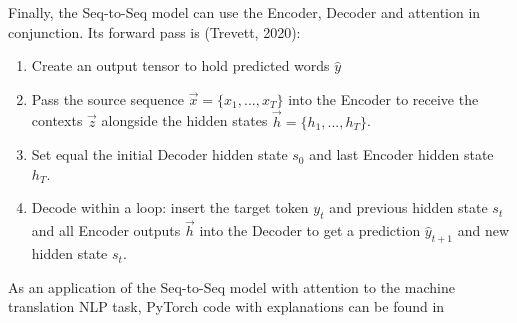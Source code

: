 Finally, the Seq-to-Seq model can use the Encoder, Decoder and attention in conjunction. Its forward pass is (Trevett, 2020): 
\begin{enumerate}
    \item Create an output tensor to hold predicted words $\hat{y}$
    
    \item Pass the source sequence $\overrightarrow{x} = \Big \{ x_1, ..., x_T \Big \}$ into the Encoder to receive the contexts $\overrightarrow{z}$ alongside the hidden states $\overrightarrow{h} = \Big \{ h_1, ..., h_T \Big \}$.
    
    \item Set equal the initial Decoder hidden state $s_0$ and last Encoder hidden state $h_T$.
    
    \item Decode within a loop: insert the target token $y_t$ and previous hidden state $s_t$ and all Encoder outputs $\overrightarrow{h}$ into the Decoder to get a prediction $\hat{y}_{t+1}$ and new hidden state $s_t$.
    
    
\end{enumerate}

As an application of the Seq-to-Seq model with attention to the machine translation NLP task, PyTorch code with explanations can be found in 
